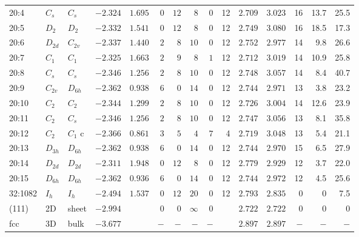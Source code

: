 \begin{table}[ht!]
\begin{tabular}{lllrrrrrrrrrrrr}
20:4    & $C_s$    & $C_{s }$ & $-2.324$ & $1.695$  & $0$ & $12$ & $8$      & $0$ & 12 & $2.709$ & $3.023$ & 16  & 13.7 &  25.5    \\
20:5    & $D_2$    & $D_{2 }$ & $-2.332$ & $1.541$  & $0$ & $12$ & $8$      & $0$ & 12 & $2.749$ & $3.080$ & 16  & 18.5 &  17.3    \\
20:6    & $D_{2d}$ & $C_{2v}$ & $-2.337$ & $1.440$  & $2$ & $8$  & $10$     & $0$ & 12 & $2.752$ & $2.977$ & 14  & 9.8  &  26.6    \\
20:7    & $C_1$    & $C_{1 }$ & $-2.325$ & $1.663$  & $2$ & $9$  & $8$      & $1$ & 12 & $2.712$ & $3.019$ & 14  & 10.9 &  25.8    \\
20:8    & $C_s$    & $C_{s }$ & $-2.346$ & $1.256$  & $2$ & $8$  & $10$     & $0$ & 12 & $2.748$ & $3.057$ & 14  & 8.4  &  40.7    \\
20:9    & $C_{2v}$ & $D_{6h}$ & $-2.362$ & $0.938$  & $6$ & $0$  & $14$     & $0$ & 12 & $2.744$ & $2.971$ & 13  & 3.8  &  23.2    \\
20:10   & $C_2$    & $C_{2 }$ & $-2.344$ & $1.299$  & $2$ & $8$  & $10$     & $0$ & 12 & $2.726$ & $3.004$ & 14  & 12.6 &  23.9    \\
20:11   & $C_2$    & $C_{s }$ & $-2.346$ & $1.256$  & $2$ & $8$  & $10$     & $0$ & 12 & $2.747$ & $3.056$ & 13  & 8.1  &  35.8    \\
20:12   & $C_2$    & $C_1$ c  & $-2.366$ & $0.861$  & $3$ & $5$  & $4$      & $7$ & 4  & $2.719$ & $3.048$ & 13  & 5.4  &  21.1    \\
20:13   & $D_{3h}$ & $D_{6h}$ & $-2.362$ & $0.938$  & $6$ & $0$  & $14$     & $0$ & 12 & $2.744$ & $2.970$ & 15  & 6.5  &  27.9    \\
20:14   & $D_{2d}$ & $D_{2d}$ & $-2.311$ & $1.948$  & $0$ & $12$ & $8$      & $0$ & 12 & $2.779$ & $2.929$ & 12  & 3.7  &  22.0    \\
20:15   & $D_{6h}$ & $D_{6h}$ & $-2.362$ & $0.936$  & $6$ & $0$  & $14$     & $0$ & 12 & $2.744$ & $2.972$ & 12  & 4.5  &  25.6    \\
32:1082 & $I_h$    & $I_h$    & $-2.494$ & $1.537$  & $0$ & $12$ & $20$     & $0$ & 12 & $2.793$ & $2.835$ & 0   & 0    &  7.5   \\
(111)   & 2D       & sheet    & $-2.994$ &          & $0$ & $0$  & $\infty$ & $0$ &    & $2.722$ & $2.722$ & 0   & 0    & 0   \\
fcc     & 3D       & bulk     & $-3.677$ &          & $-$ & $-$  & $-$      & $-$ &    & $2.897$ & $2.897$ & $-$ & $-$  & $-$ \\
		\bottomrule
	\end{tabular}
	\label{tab:neutral}
\end{table}


